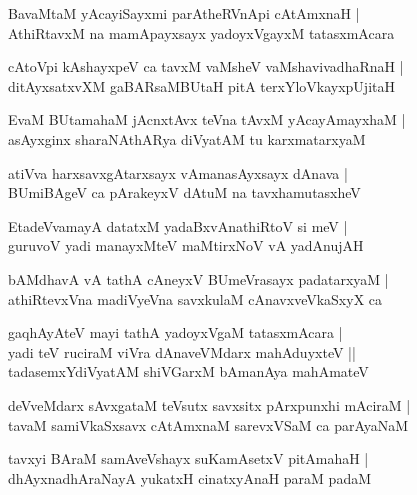 \begin{shloka}
BavaMtaM yAcayiSayxmi parAtheRVnApi cAtAmxnaH |\\
AthiRtavxM na mamApayxsayx yadoyxVgayxM tatasxmAcara
\end{shloka}

\begin{shloka}
cAtoVpi kAshayxpeV ca tavxM vaMsheV vaMshavivadhaRnaH |\\
ditAyxsatxvXM gaBARsaMBUtaH pitA terxYloVkayxpUjitaH 
\end{shloka}

\begin{shloka}
EvaM BUtamahaM jAcnxtAvx teVna tAvxM yAcayAmayxhaM |\\
asAyxginx sharaNAthARya diVyatAM tu karxmatarxyaM 
\end{shloka}

\begin{shloka}
atiVva harxsavxgAtarxsayx vAmanasAyxsayx dAnava |\\
BUmiBAgeV ca pArakeyxV dAtuM na tavxhamutasxheV 
\end{shloka}

\begin{shloka}
EtadeVvamayA datatxM yadaBxvAnathiRtoV si meV |\\
guruvoV yadi manayxMteV maMtirxNoV vA yadAnujAH 
\end{shloka}

\begin{shloka}
bAMdhavA vA tathA cAneyxV BUmeVrasayx padatarxyaM |\\
athiRtevxVna madiVyeVna savxkulaM cAnavxveVkaSxyX ca 
\end{shloka}

\begin{shloka}
gaqhAyAteV mayi tathA yadoyxVgaM tatasxmAcara |\\
yadi teV ruciraM viVra dAnaveVMdarx mahAduyxteV ||\\
tadasemxYdiVyatAM shiVGarxM bAmanAya mahAmateV
\end{shloka}

\begin{shloka}
deVveMdarx sAvxgataM teVsutx savxsitx pArxpunxhi mAciraM |\\
tavaM samiVkaSxsavx cAtAmxnaM sarevxVSaM ca parAyaNaM
\end{shloka}

\begin{shloka}
tavxyi BAraM samAveVshayx suKamAsetxV pitAmahaH |\\
dhAyxnadhAraNayA yukatxH cinatxyAnaH paraM padaM
\end{shloka}

